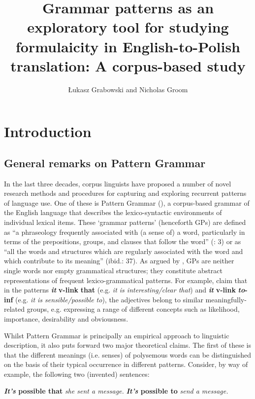 \documentclass[output=paper]{langscibook}
\author{Łukasz Grabowski\affiliation{University of Opole} and Nicholas Groom\affiliation{University of Birmingham}}
\title[Grammar patterns as a tool for studying formulaicity in Eng-Pol translation]{Grammar patterns as an exploratory tool for studying formulaicity in English-to-Polish translation: A corpus-based study }
\begin{document}
\maketitle 

\section{Introduction}
\subsection{General remarks on Pattern Grammar}

In the last three decades, corpus linguists have proposed a number of novel research methods and procedures for capturing and exploring recurrent patterns of language use. One of these is Pattern Grammar (\citealt{HunstonFrancis2000}), a corpus-based grammar of the English language that describes the lexico-syntac\-tic environments of individual lexical items. These ‘grammar patterns’ (henceforth GPs) are defined as “a phraseology frequently associated with (a sense of) a word, particularly in terms of the prepositions, groups, and clauses that follow the word” (\citealt{HunstonFrancis2000}: 3) or as “all the words and structures which are regularly associated with the word and which contribute to its meaning” (ibid.: 37). As argued by \citet[142]{Römer2009}, GPs are neither single words nor empty grammatical structures; they constitute abstract representations of frequent lexico-grammatical patterns. For example, \citet[29]{HunstonFrancis2000} claim that in the patterns \textbf{\textit{it} }\textbf{v-link} \textbf{{\ADJ}} \textbf{that} (e.g. \textit{it is interesting/clear that})  and \textbf{\textit{it} }\textbf{v-link} \textbf{{\ADJ}} \textbf{\textit{to}}\textbf{{}-inf} (e.g. \textit{it is sensible/possible to}), the adjectives belong to similar meaningfully-related groups, e.g. expressing a range of different concepts such as likelihood, importance, desirability and obviousness.

Whilst Pattern Grammar is principally an empirical approach to linguistic description, it also puts forward two major theoretical claims. The first of these is that the different meanings (i.e. senses) of polysemous words can be distinguished on the basis of their typical occurrence in different patterns. Consider, by way of example, the following two (invented) sentences: 

\ea \textbf{\textit{It’s} \textbf{possible} \textbf{that}} \textit{she sent a message.} \label{ex:grabowski:1}
\ex \textbf{\textit{It’s} \textbf{possible} \textbf{to}} \textit{send a message.} \label{ex:grabowski:2}
\z
\end{document}
